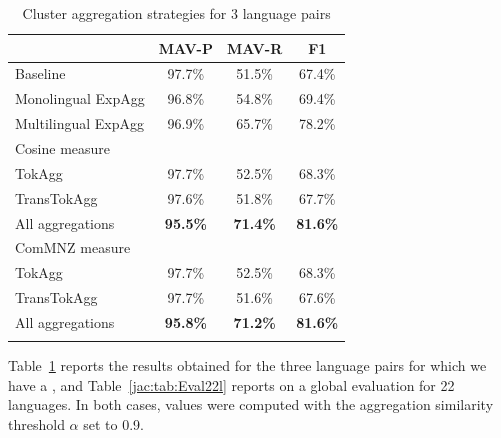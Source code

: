 \documentclass[output=paper]{langsci/langscibook}
\begin{document}
\begin{table}[h]
\begin{tabular}{lccc}\lsptoprule
&  \textnormal{MAV-P}  & \textnormal{MAV-R}  &  \textnormal{F1} \\ 
\midrule
Baseline                &     97.7\%   &  51.5\%  & 67.4\%  \\  
Monolingual ExpAgg   &  96.8\%   &  54.8\%  & 69.4\%  \\
Multilingual ExpAgg  &     96.9\%   &  65.7\%  & 78.2\%  \\ 
\midrule
\textnormal{Cosine measure}                 & & &   \\
TokAgg          &     97.7\%   &  52.5\%  & 68.3\%  \\   
TransTokAgg  &     97.6\%   &  51.8\%  & 67.7\%  \\  
All aggregations &     \textbf{95.5\%}   &  \textbf{71.4\%}  &  
\textbf{81.6\%}  \\
\midrule
\textnormal{ComMNZ measure}                         &    &   &   \\ 
TokAgg          &     97.7\%   &  52.5\%  & 68.3\%  \\   
TransTokAgg   &     97.7\%   &  51.6\%  & 67.6\%  \\  
All aggregations &     \textbf{95.8\%}   &  \textbf{71.2\%}  & 
\textbf{81.6\%}  \\ 
\lspbottomrule
\end{tabular}
\caption{Cluster aggregation strategies for 3 language pairs}
\label{jac:tab:Eval3l}
\end{table}


Table~\ref{jac:tab:Eval3l} reports the results obtained for the three language pairs 
for which we have a , and Table~\ref{jac:tab:Eval22l} reports on a 
global evaluation for 22 languages. In both cases, values were computed with the 
aggregation similarity threshold $\alpha$ set to 0.9.
\end{document}
